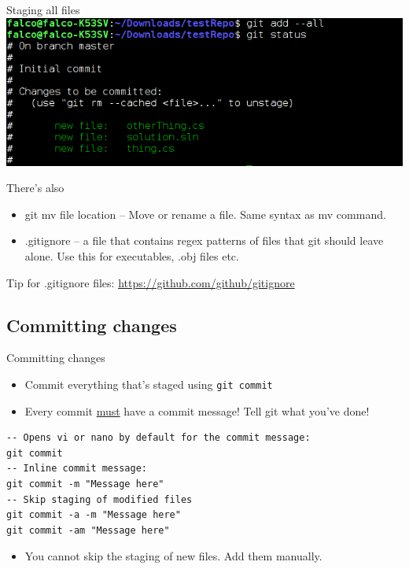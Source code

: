 \documentclass[10pt,a4paper]{beamer}
\begin{document}
\begin{frame}{Staging all files}
\includegraphics[width=\linewidth]{gitaddall.png}
\end{frame}

\begin{frame}{There's also}

\begin{itemize}
\item git mv file location -- Move or rename a file. Same syntax as mv command.
\item .gitignore -- a file that contains regex patterns of files that git should leave alone. Use this for executables, .obj files etc.
\end{itemize}
Tip for .gitignore files:
\href{https://github.com/github/gitignore}{\color{blue}https://github.com/github/gitignore}
\end{frame}

\subsection{Committing changes}
\begin{frame}[fragile]{Committing changes}
\begin{itemize}
\item Commit everything that's staged using \texttt{git commit}
\item Every commit \uline{must} have a commit message! Tell git what you've done!
\end{itemize}
\begin{verbatim}
-- Opens vi or nano by default for the commit message:
git commit
-- Inline commit message:
git commit -m "Message here"
-- Skip staging of modified files
git commit -a -m "Message here"
git commit -am "Message here"
\end{verbatim}
\begin{itemize}
\item You cannot skip the staging of new files. Add them manually.
\end{itemize}
\end{frame}
\end{document}
